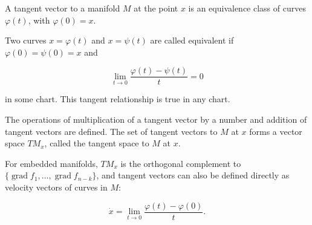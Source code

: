 A tangent vector to a manifold $M$ at the point $x$ is an equivalence class of curves $\varphi(t)$, with $\varphi(0) = x$.

Two curves $x = \varphi(t)$ and $x = \psi(t)$ are called equivalent if $\varphi(0) = \psi(0) = x$ and

$$\lim_{t \to 0} \frac{\varphi(t) - \psi(t)}{t} = 0$$

in some chart. This tangent relationship is true in any chart.

The operations of multiplication of a tangent vector by a number and addition of tangent vectors are defined. The set of tangent vectors to $M$ at $x$ forms a vector space $TM_x$, called the tangent space to $M$ at $x$.

For embedded manifolds, $TM_x$ is the orthogonal complement to $\{\operatorname{grad} f_1, \ldots, \operatorname{grad} f_{n-k}\}$, and tangent vectors can also be defined directly as velocity vectors of curves in $M$:

$$\dot{x} = \lim_{t \to 0} \frac{\varphi(t) - \varphi(0)}{t}.$$
